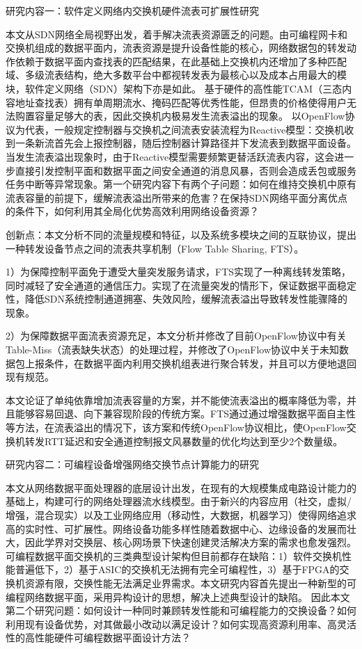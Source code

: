 {\hei 研究内容一：软件定义网络内交换机硬件流表可扩展性研究}

{\hei 本文从SDN网络全局视野出发，着手解决流表资源匮乏的问题。}由可编程网卡和交换机组成的数据平面内，流表资源是提升设备性能的核心，网络数据包的转发动作依赖于数据平面内查找表的匹配结果，在此基础上交换机内还增加了多种匹配域、多级流表结构，绝大多数平台中都视转发表为最核心以及成本占用最大的模块，软件定义网络（SDN）架构下亦是如此。
基于硬件的高性能TCAM（三态内容地址查找表）拥有单周期流水、掩码匹配等优秀性能，但昂贵的价格使得用户无法购置容量足够大的表，因此交换机内极易发生流表溢出的现象。
以OpenFlow协议为代表，一般规定控制器与交换机之间流表安装流程为Reactive模型：交换机收到一条新流首先会上报控制器，随后控制器计算路径并下发流表到数据平面设备。当发生流表溢出现象时，由于Reactive模型需要频繁更替活跃流表内容，这会进一步直接引发控制平面和数据平面之间安全通道的消息风暴，否则会造成丢包或服务任务中断等异常现象。第一个研究内容下有两个子问题：如何在维持交换机中原有流表容量的前提下，缓解流表溢出所带来的危害？在保持SDN网络平面分离优点的条件下，如何利用其全局化优势高效利用网络设备资源？


{\hei 创新点：}本文分析不同的流量规模和特征，以及系统多模块之间的互联协议，提出一种转发设备节点之间的流表共享机制（Flow Table Sharing, FTS）。

1）为保障控制平面免于遭受大量突发服务请求，FTS实现了一种离线转发策略，同时减轻了安全通道的通信压力。实现了在流量突发的情形下，保证数据平面稳定性，降低SDN系统控制通道拥塞、失效风险，缓解流表溢出导致转发性能骤降的现象。

2）为保障数据平面流表资源充足，本文分析并修改了目前OpenFlow协议中有关Table-Miss（流表缺失状态）的处理过程，并修改了OpenFlow协议中关于未知数据包上报条件，在数据平面内利用交换机组表进行聚合转发，并且可以方便地退回现有规范。

本文论证了单纯依靠增加流表容量的方案，并不能使流表溢出的概率降低为零，并且能够容易回退、向下兼容现阶段的传统方案。FTS通过通过增强数据平面自主性等方法，在流表溢出的情况下，该方案和传统OpenFlow协议相比，使OpenFlow交换机转发RTT延迟和安全通道控制报文风暴数量的优化均达到至少2个数量级。



{\hei 研究内容二：可编程设备增强网络交换节点计算能力的研究}

{\hei 本文从网络数据平面处理器的底层设计出发，在现有的大规模集成电路设计能力的基础上，构建可行的网络处理器流水线模型。}由于新兴的内容应用（社交，虚拟/增强，混合现实）以及工业网络应用（移动性，大数据，机器学习）使得网络追求高的实时性、可扩展性。网络设备功能多样性随着数据中心、边缘设备的发展而壮大，因此学界对交换层、核心网场景下快速创建灵活解决方案的需求也愈发强烈。可编程数据平面交换机的三类典型设计架构但目前都存在缺陷：1）软件交换机性能普遍低下，2）基于ASIC的交换机无法拥有完全可编程性，3）基于FPGA的交换机资源有限，交换性能无法满足业界需求。本文研究内容首先提出一种新型的可编程网络数据平面，采用异构设计的思想，解决上述典型设计的缺陷。
因此本文第二个研究问题：如何设计一种同时兼顾转发性能和可编程能力的交换设备？如何利用现有设备优势，对其做最小改动以满足设计？如何实现高资源利用率、高灵活性的高性能硬件可编程数据平面设计方法？

